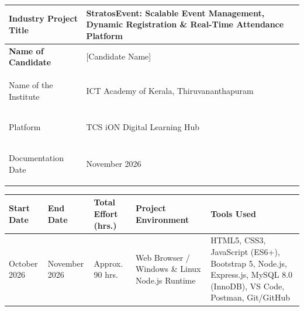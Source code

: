 \documentclass[11pt,a4paper]{article}
\begin{document}
\noindent
\begin{tabularx}{\textwidth}{
  |>{\raggedright\arraybackslash\bfseries}p{}
  |>{\raggedright\arraybackslash}X|
}

\hline

\cellcolor{LabelBlue}
Industry Project Title &
StratosEvent: Scalable Event Management, Dynamic Registration \& Real-Time Attendance Platform
\\\hline

\cellcolor{LabelBlue}
Name of Candidate &
\cellcolor{RowGray}[Candidate Name]
\\\hline

\cellcolor{LabelBlue}
Name of the Institute &
ICT Academy of Kerala, Thiruvananthapuram 
\\\hline

\cellcolor{LabelBlue}
Platform &
\cellcolor{RowGray}TCS iON Digital Learning Hub
\\\hline

\cellcolor{LabelBlue}
Documentation Date &
November 2026
\\\hline

\end{tabularx}

\endgroup

\vspace{0.36in}

\begingroup

\fontsize{9.5}{11.5}\selectfont
\renewcommand{\arraystretch}{1.55}
\setlength{\tabcolsep}{5pt}

\noindent
\begin{tabularx}{\textwidth}{
  |>{\raggedright\arraybackslash}p{}
  |>{\raggedright\arraybackslash}p{}
  |>{\raggedright\arraybackslash}p{}
  |>{\raggedright\arraybackslash}p{}
  |>{\raggedright\arraybackslash}X|
}

\hline

\rowcolor{TCSBlue}

\color{white}\bfseries Start Date &
\color{white}\bfseries End Date &
\color{white}\bfseries Total Effort (hrs.) &
\color{white}\bfseries Project Environment &
\color{white}\bfseries Tools Used
\\\hline

October 2026 &
November 2026 &
Approx. 90 hrs. &
Web Browser / Windows \& Linux Node.js Runtime &
HTML5, CSS3, JavaScript (ES6+), Bootstrap 5, Node.js, Express.js, MySQL 8.0 (InnoDB), VS Code, Postman, Git/GitHub
\\\hline

\end{tabularx}
\end{document}
